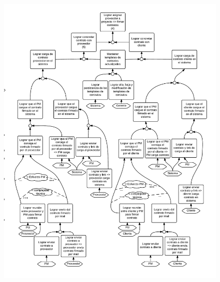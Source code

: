 \begin{figure}[H]
\includegraphics[width=\textwidth, clip=true, trim=15pt 0pt 15pt 0pt]{imagenes/objetivos/objetivos13.pdf}
\end{figure}

